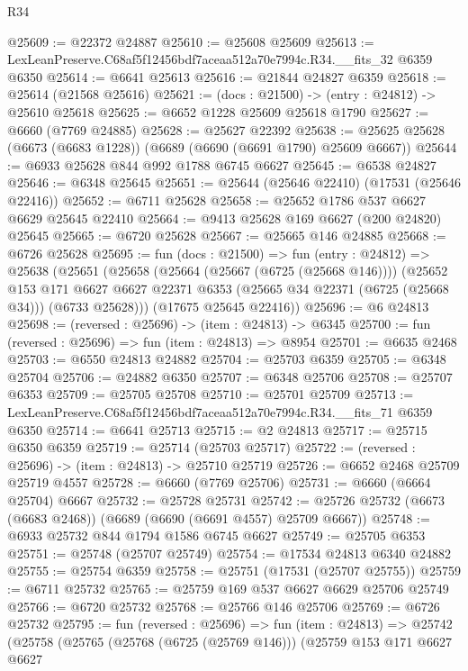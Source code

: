 \begin{lexlean}{R34}
\begin{coremodule}
@25609 := @22372 @24887
@25610 := @25608 @25609
@25613 := LexLeanPreserve.C68af5f12456bdf7aceaa512a70e7994c.R34.__fits_32 @6359 @6350
@25614 := @6641 @25613
@25616 := @21844 @24827 @6359
@25618 := @25614 (@21568 @25616)
@25621 := (docs : @21500) -> (entry : @24812) -> @25610 @25618
@25625 := @6652 @1228 @25609 @25618 @1790
@25627 := @6660 (@7769 @24885)
@25628 := @25627 @22392
@25638 := @25625 @25628 (@6673 (@6683 @1228)) (@6689 (@6690 (@6691 @1790) @25609 @6667))
@25644 := @6933 @25628 @844 @992 @1788 @6745 @6627
@25645 := @6538 @24827
@25646 := @6348 @25645
@25651 := @25644 (@25646 @22410) (@17531 (@25646 @22416))
@25652 := @6711 @25628
@25658 := @25652 @1786 @537 @6627 @6629 @25645 @22410
@25664 := @9413 @25628 @169 @6627 (@200 @24820) @25645
@25665 := @6720 @25628
@25667 := @25665 @146 @24885
@25668 := @6726 @25628
@25695 := fun (docs : @21500) =>
  fun (entry : @24812) =>
  @25638
    (@25651
      (@25658
        (@25664 (@25667 (@6725 (@25668 @146))))
        (@25652
          @153
          @171
          @6627
          @6627
          @22371
          @6353
          (@25665 @34 @22371 (@6725 (@25668 @34)))
          (@6733 @25628)))
      (@17675 @25645 @22416))
@25696 := @6 @24813
@25698 := (reversed : @25696) -> (item : @24813) -> @6345
@25700 := fun (reversed : @25696) => fun (item : @24813) => @8954
@25701 := @6635 @2468
@25703 := @6550 @24813 @24882
@25704 := @25703 @6359
@25705 := @6348 @25704
@25706 := @24882 @6350
@25707 := @6348 @25706
@25708 := @25707 @6353
@25709 := @25705 @25708
@25710 := @25701 @25709
@25713 := LexLeanPreserve.C68af5f12456bdf7aceaa512a70e7994c.R34.__fits_71 @6359 @6350
@25714 := @6641 @25713
@25715 := @2 @24813
@25717 := @25715 @6350 @6359
@25719 := @25714 (@25703 @25717)
@25722 := (reversed : @25696) -> (item : @24813) -> @25710 @25719
@25726 := @6652 @2468 @25709 @25719 @4557
@25728 := @6660 (@7769 @25706)
@25731 := @6660 (@6664 @25704) @6667
@25732 := @25728 @25731
@25742 := @25726 @25732 (@6673 (@6683 @2468)) (@6689 (@6690 (@6691 @4557) @25709 @6667))
@25748 := @6933 @25732 @844 @1794 @1586 @6745 @6627
@25749 := @25705 @6353
@25751 := @25748 (@25707 @25749)
@25754 := @17534 @24813 @6340 @24882
@25755 := @25754 @6359
@25758 := @25751 (@17531 (@25707 @25755))
@25759 := @6711 @25732
@25765 := @25759 @169 @537 @6627 @6629 @25706 @25749
@25766 := @6720 @25732
@25768 := @25766 @146 @25706
@25769 := @6726 @25732
@25795 := fun (reversed : @25696) =>
  fun (item : @24813) =>
  @25742
    (@25758
      (@25765
        (@25768 (@6725 (@25769 @146)))
        (@25759
          @153
          @171
          @6627
          @6627

\end{coremodule}
\end{lexlean}
